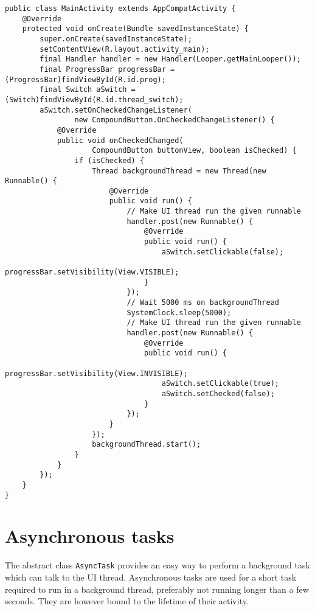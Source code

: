 \begin{lstlisting}[style=A_Java, caption={Background job with a thread and communication to UI thread with a handler}, label={listing:layoutprg}]
public class MainActivity extends AppCompatActivity {
    @Override
    protected void onCreate(Bundle savedInstanceState) {
        super.onCreate(savedInstanceState);
        setContentView(R.layout.activity_main);
        final Handler handler = new Handler(Looper.getMainLooper());
        final ProgressBar progressBar = (ProgressBar)findViewById(R.id.prog);
        final Switch aSwitch = (Switch)findViewById(R.id.thread_switch);
        aSwitch.setOnCheckedChangeListener(
                new CompoundButton.OnCheckedChangeListener() {
            @Override
            public void onCheckedChanged(
                    CompoundButton buttonView, boolean isChecked) {
                if (isChecked) {
                    Thread backgroundThread = new Thread(new Runnable() {
                        @Override
                        public void run() {
                            // Make UI thread run the given runnable
                            handler.post(new Runnable() {
                                @Override
                                public void run() {
                                    aSwitch.setClickable(false);
                                    progressBar.setVisibility(View.VISIBLE);
                                }
                            });
                            // Wait 5000 ms on backgroundThread
                            SystemClock.sleep(5000);
                            // Make UI thread run the given runnable
                            handler.post(new Runnable() {
                                @Override
                                public void run() {
                                    progressBar.setVisibility(View.INVISIBLE);
                                    aSwitch.setClickable(true);
                                    aSwitch.setChecked(false);
                                }
                            });
                        }
                    });
                    backgroundThread.start();
                }
            }
        });
    }
}
\end{lstlisting}

\section{Asynchronous tasks}
The abstract class \texttt{AsyncTask} provides an easy way to perform a background task which can talk to the UI thread. Asynchronous tasks are used for a short task required to run in a background thread, preferably not running longer than a few seconds. They are however bound to the lifetime of their activity.\\

